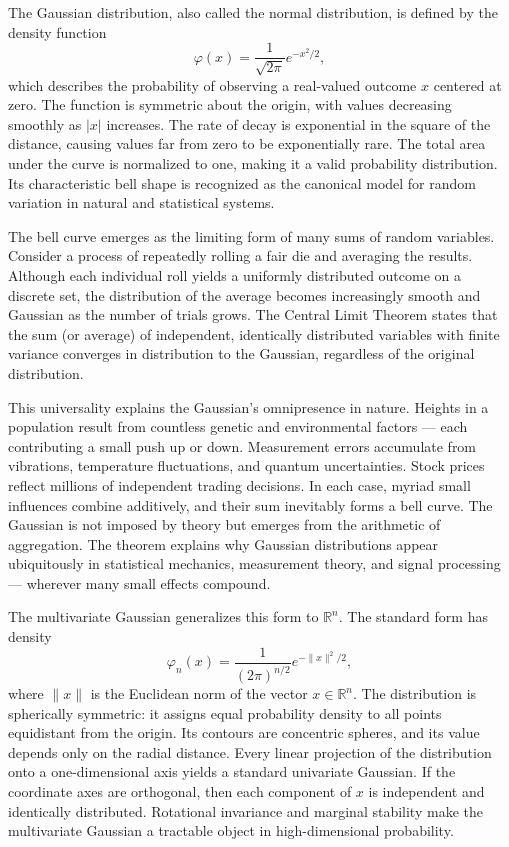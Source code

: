 The Gaussian distribution, also called the normal distribution, is defined by the density function
\[
\varphi(x) = \frac{1}{\sqrt{2\pi}} e^{-x^2/2},
\]
which describes the probability of observing a real-valued outcome \( x \) centered at zero. The function is symmetric about the origin, with values decreasing smoothly as \( |x| \) increases. The rate of decay is exponential in the square of the distance, causing values far from zero to be exponentially rare. The total area under the curve is normalized to one, making it a valid probability distribution. Its characteristic bell shape is recognized as the canonical model for random variation in natural and statistical systems.

The bell curve emerges as the limiting form of many sums of random variables. Consider a process of repeatedly rolling a fair die and averaging the results. Although each individual roll yields a uniformly distributed outcome on a discrete set, the distribution of the average becomes increasingly smooth and Gaussian as the number of trials grows. The Central Limit Theorem states that the sum (or average) of independent, identically distributed variables with finite variance converges in distribution to the Gaussian, regardless of the original distribution. 

This universality explains the Gaussian's omnipresence in nature. Heights in a population result from countless genetic and environmental factors — each contributing a small push up or down. Measurement errors accumulate from vibrations, temperature fluctuations, and quantum uncertainties. Stock prices reflect millions of independent trading decisions. In each case, myriad small influences combine additively, and their sum inevitably forms a bell curve. The Gaussian is not imposed by theory but emerges from the arithmetic of aggregation. The theorem explains why Gaussian distributions appear ubiquitously in statistical mechanics, measurement theory, and signal processing — wherever many small effects compound.

The multivariate Gaussian generalizes this form to \( \mathbb{R}^n \). The standard form has density
\[
\varphi_n(x) = \frac{1}{(2\pi)^{n/2}} e^{-\|x\|^2/2},
\]
where \( \|x\| \) is the Euclidean norm of the vector \( x \in \mathbb{R}^n \). The distribution is spherically symmetric: it assigns equal probability density to all points equidistant from the origin. Its contours are concentric spheres, and its value depends only on the radial distance. Every linear projection of the distribution onto a one-dimensional axis yields a standard univariate Gaussian. If the coordinate axes are orthogonal, then each component of \( x \) is independent and identically distributed. Rotational invariance and marginal stability make the multivariate Gaussian a tractable object in high-dimensional probability.

